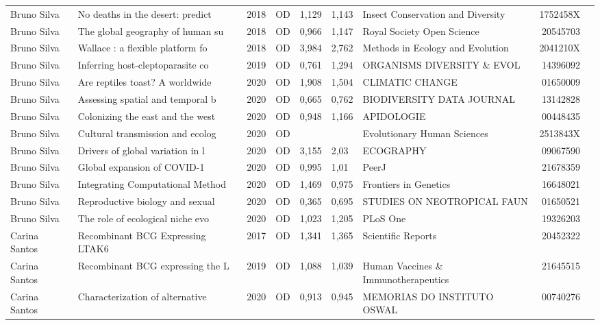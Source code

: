 \documentclass[12pt,brazil]{article}\usepackage[]{graphicx}\usepackage[]{xcolor}
\begin{document}
\begin{longtable}{lllrrllrr}
Bruno Silva & No deaths in the desert: predict & 2018 & OD & 1,129 & 1,143 & Insect Conservation and Diversity & 1752458X \\
Bruno Silva & The global geography of human su & 2018 & OD & 0,966 & 1,147 & Royal Society Open Science & 20545703 \\
Bruno Silva & Wallace : a flexible platform fo & 2018 & OD & 3,984 & 2,762 & Methods in Ecology and Evolution & 2041210X \\
Bruno Silva & Inferring host-cleptoparasite co & 2019 & OD & 0,761 & 1,294 & ORGANISMS DIVERSITY \& EVOL & 14396092 \\
Bruno Silva & Are reptiles toast? A worldwide  & 2020 & OD & 1,908 & 1,504 & CLIMATIC CHANGE & 01650009 \\
Bruno Silva & Assessing spatial and temporal b & 2020 & OD & 0,665 & 0,762 & BIODIVERSITY DATA JOURNAL & 13142828 \\
Bruno Silva & Colonizing the east and the west & 2020 & OD & 0,948 & 1,166 & APIDOLOGIE & 00448435 \\
Bruno Silva & Cultural transmission and ecolog & 2020 & OD &  &  & Evolutionary Human Sciences & 2513843X \\
Bruno Silva & Drivers of global variation in l & 2020 & OD & 3,155 & 2,03 & ECOGRAPHY & 09067590 \\
Bruno Silva & Global expansion of COVID-1 & 2020 & OD & 0,995 & 1,01 & PeerJ & 21678359 \\
Bruno Silva & Integrating Computational Method & 2020 & OD & 1,469 & 0,975 & Frontiers in Genetics & 16648021 \\
Bruno Silva & Reproductive biology and sexual  & 2020 & OD & 0,365 & 0,695 & STUDIES ON NEOTROPICAL FAUN & 01650521 \\
Bruno Silva & The role of ecological niche evo & 2020 & OD & 1,023 & 1,205 & PLoS One & 19326203 \\
Carina Santos & Recombinant BCG Expressing LTAK6 & 2017 & OD & 1,341 & 1,365 & Scientific Reports & 20452322 \\
\rowcolor{duplic}\rowcolor{duplic}\rowcolor{duplic}\rowcolor{duplic}\rowcolor{duplic}\rowcolor{duplic}\rowcolor{duplic}\rowcolor{duplic}\rowcolor{duplic}\rowcolor{duplic}\rowcolor{duplic}\rowcolor{duplic}\rowcolor{duplic}\rowcolor{duplic}\rowcolor{duplic}\rowcolor{duplic}Carina Santos & Recombinant BCG expressing the L & 2019 & OD & 1,088 & 1,039 & Human Vaccines \& Immunotherapeutics & 21645515 \\
Carina Santos & Characterization of alternative  & 2020 & OD & 0,913 & 0,945 & MEMORIAS DO INSTITUTO OSWAL & 00740276 \\

\end{longtable}
\end{document}
